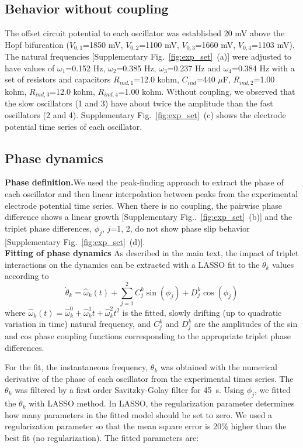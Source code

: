 \documentclass[12pt]{article}
\theoremstyle{plain}
\theoremstyle{definition}
\theoremstyle{remark}
\theoremstyle{remark}
\begin{document}
\subsection{Behavior without coupling} The offset circuit potential to each oscillator was established 20 mV above the Hopf bifurcation ($V_{0, 1}$=1850 mV, $V_{0, 2}$=1100 mV, $V_{0, 3}$=1660 mV, $V_{0, 4}$=1103 mV). The natural frequencies [Supplementary Fig.~\ref{fig:exp_set}~(a)] were adjusted to have values of $\omega_1$=0.152 Hz, $\omega_2$=0.385 Hz, $\omega_3$=0.237 Hz and $\omega_4$=0.384 Hz with a set of resistors and capacitors $R_{ind, 1}$=12.0 kohm, $C_{ind}$=440 $\mu$F, $R_{ind, 2}$=1.00 kohm, $R_{ind, 3}$=12.0 kohm, $R_{ind, 4}$=1.00 kohm. Without coupling, we observed that the slow oscillators (1 and 3) have about twice the amplitude than the fast oscillators (2 and 4). Supplementary Fig.~\ref{fig:exp_set}~(c) shows the electrode potential time series of each oscillator.

\subsection{Phase dynamics}

\textbf{Phase definition.}We used the peak-finding approach \cite{pikovsky2003synchronization} to extract the phase of each oscillator and then linear interpolation between peaks from the experimental electrode potential time series. When there is no coupling, the pairwise phase difference shows a linear growth [Supplementary Fig..~\ref{fig:exp_set}~(b)] and the triplet phase differences, $\phi_j$, $j$=1, 2, do not show phase slip behavior [Supplementary Fig.~\ref{fig:exp_set}~(d)].  ~\\

\textbf{Fitting of phase dynamics} As described in the main text, the impact of triplet interactions on the dynamics can be extracted with 
a LASSO fit to the $\dot{\theta}_k$ values according to
\begin{equation}\label{eq:exp}
\dot{\theta}_k = \hat{\omega}_k(t) +   \sum_{j=1}^{2} C_j^k \sin (\phi_j) 
+ D_j^k \cos (\phi_j)
\end{equation}
where $\hat{\omega}_k(t) = \hat{\omega}^0_k + \hat{\omega}^1_k t + \hat{\omega}^2_k t^2 $  is the fitted, slowly drifting (up to quadratic variation in time) natural frequency, and $C_j^k$ and $D_j^k$ are the amplitudes  of the sin and cos phase  coupling functions corresponding to the appropriate triplet phase differences. 

For the fit, the instantaneous frequency, $\dot{\theta}_k$ was obtained with the numerical derivative of the phase of each oscillator from the experimental times series. The $\dot{\theta}_k$ was filtered by a first order Savitzky-Golay filter for 45~s. Using $\phi_j$, we fitted the $\dot{\theta}_k$ with LASSO method. In LASSO, the regularization parameter determines how many parameters in the fitted model should be set to zero. We used a regularization parameter so that the mean square error is 20\% higher than the best fit (no regularization). The fitted parameters are: 
\end{document}
